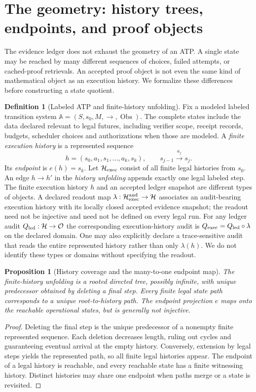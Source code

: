 \documentclass[11pt,letterpaper]{article}
\newtheorem{proposition}[theorem]{Proposition}
\theoremstyle{definition}
\newtheorem{definition}[theorem]{Definition}
\newcommand{\Hh}{\mathcal H}
\newcommand{\Obs}{\mathcal O}
\begin{document}
\section{The geometry: history trees, endpoints, and proof objects}\label{sec:geometry}
The evidence ledger does not exhaust the geometry of an ATP. A single state may be reached by many different sequences of choices, failed attempts, or cached-proof retrievals. An accepted proof object is not even the same kind of mathematical object as an execution history. We formalize these differences before constructing a state quotient.

\begin{definition}[Labeled ATP and finite-history unfolding]
Fix a modeled labeled transition system $\mathbb A=(S,s_0,M,\longrightarrow,\operatorname{Obs})$. The complete states include the data declared relevant to legal futures, including verifier scope, receipt records, budgets, scheduler choices and authorizations when those are modeled. A \emph{finite execution history} is a represented sequence
\[
h=(s_0,a_1,s_1,\ldots,a_k,s_k),\qquad s_{j-1}\mathrel{\xrightarrow{a_j}}s_j.
\]
Its \emph{endpoint} is $e(h)=s_k$. Let $\Hh_{\rm exec}$ consist of all finite legal histories from $s_0$. An edge $h\to h'$ in the \emph{history unfolding} appends exactly one legal labeled step. The finite execution history $h$ and an accepted ledger snapshot are different types of objects. A declared readout map $\lambda:\Hh_{\rm exec}^{\rm aud}\to\Hh$ associates an audit-bearing execution history with its locally closed accepted evidence snapshot; the readout need not be injective and need not be defined on every legal run. For any ledger audit $Q_{\rm led}:\Hh\to\Obs$ the corresponding execution-history audit is $Q_{\rm exec}=Q_{\rm led}\circ\lambda$ on the declared domain. One may also explicitly declare a trace-sensitive audit that reads the entire represented history rather than only $\lambda(h)$. We do not identify these types or domains without specifying the readout.
\end{definition}

\begin{proposition}[History coverage and the many-to-one endpoint map]\label{prop:unfold}
The finite-history unfolding is a rooted directed tree, possibly infinite, with unique predecessor obtained by deleting a final step. Every finite legal state path corresponds to a unique root-to-history path. The endpoint projection $e$ maps onto the reachable operational states, but is generally not injective.
\end{proposition}
\begin{proof}
Deleting the final step is the unique predecessor of a nonempty finite represented sequence. Each deletion decreases length, ruling out cycles and guaranteeing eventual arrival at the empty history. Conversely, extension by legal steps yields the represented path, so all finite legal histories appear. The endpoint of a legal history is reachable, and every reachable state has a finite witnessing history. Distinct histories may share one endpoint when paths merge or a state is revisited.
\end{proof}
\end{document}
